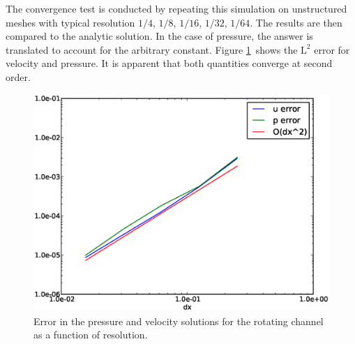 The convergence test is conducted by repeating this simulation on unstructured meshes
with typical resolution $1/4$, $1/8$, $1/16$, $1/32$, $1/64$. The results
are then compared to the analytic solution. In the case of pressure, the
answer is translated to account for the arbitrary constant. Figure
\ref{fig:periodic_channel_error}\ shows the $\textrm{L}^2$ error for
velocity and pressure. It is apparent that both quantities converge at
second order.

\begin{figure}[ht]
  \centering
  \onlypdf{\begin{pdfdisplay}}
    \includegraphics[width=1.1\textwidth]{examples_images/rotating_channel/convergence.eps}
  \onlypdf{\end{pdfdisplay}}  
  \caption{Error in the pressure and velocity solutions for the rotating channel as a function of resolution.}
  \label{fig:periodic_channel_error}
\end{figure}



